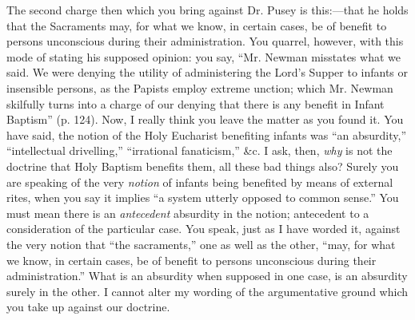 The second charge then which you bring against Dr.
Pusey is this:—that he holds that the Sacraments may, for what we
know, in certain cases, be of benefit to persons unconscious during
their administration. You quarrel, however, with this mode of stating
his supposed opinion: you say, ``Mr. Newman misstates what we said. We
were denying the utility of administering the Lord's Supper to infants
or insensible persons, as the Papists employ extreme unction; which
Mr. Newman skilfully turns into a charge of our denying that there is
any benefit in Infant Baptism'' (p. 124). Now, I really think you leave
the matter as you found it. You have said, the notion of the Holy
Eucharist benefiting infants was ``an absurdity,'' ``intellectual
drivelling,'' ``irrational fanaticism,'' \&c. I ask, then, \emph{why}
is not the doctrine that Holy Baptism benefits them, all these bad
things also? Surely you are speaking of the very \emph{notion} of
infants being benefited by means of external rites, when you say it
implies ``a system utterly opposed to common sense.'' You must mean
there is an \emph{antecedent} absurdity in the notion; antecedent to a
consideration of the particular case. You speak, just as I have worded
it, against the very notion that ``the sacraments,'' one as well as the
other, ``may, for what we know, in certain cases, be of benefit to
persons unconscious during their administration.'' What is an absurdity
when supposed in one case, is an absurdity surely in the other. I
cannot alter my wording of the argumentative ground which you take up
against our doctrine.


